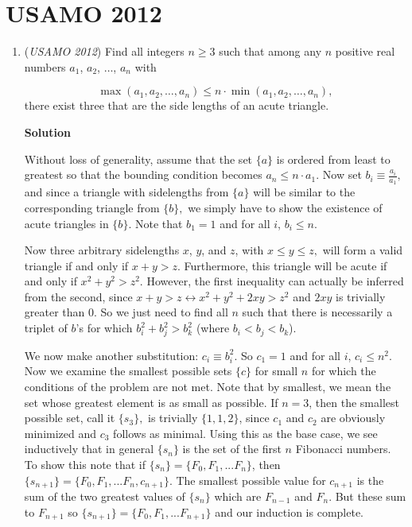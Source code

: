 \section{USAMO 2012}
        \begin{enumerate}
        	\item (\textit{USAMO 2012}) Find all integers $n \ge 3$ such that among any $n$ positive real numbers $a_1$, $a_2$, $\dots$, $a_n$ with

 \[\max(a_1, a_2, \dots, a_n) \le n \cdot \min(a_1, a_2, \dots, a_n),\]
there exist three that are the side lengths of an acute triangle.


 



\textbf{Solution}

Without loss of generality, assume that the set $\{a\}$ is ordered from least to greatest so that the bounding condition becomes $a_n \le n \cdot a_1.$ Now set $b_i \equiv \frac{a_i}{a_1},$ and since a triangle with sidelengths from $\{a\}$ will be similar to the corresponding triangle from $\{b\},$ we simply have to show the existence of acute triangles in $\{b\}.$ Note that $b_1 = 1$ and for all $i$, $b_i \le n.$

 Now three arbitrary sidelengths $x$, $y$, and $z$, with $x \le y \le z,$ will form a valid triangle if and only if $x+y>z.$ Furthermore, this triangle will be acute if and only if $x^2 + y^2 > z^2.$ However, the first inequality can actually be inferred from the second, since $x+y>z \longleftrightarrow x^2 + y^2 +2xy > z^2$ and $2xy$ is trivially greater than $0.$ So we just need to find all $n$ such that there is necessarily a triplet of $b$'s for which $b_i^2 + b_j^2 > b_k^2$ (where $b_i < b_j < b_k$).

 We now make another substitution: $c_i \equiv b_i ^2.$ So $c_1 = 1$ and for all $i$, $c_i \le n^2.$ Now we examine the smallest possible sets $\{c\}$ for small $n$ for which the conditions of the problem are not met. Note that by smallest, we mean the set whose greatest element is as small as possible. If $n=3$, then the smallest possible set, call it $\{s_3\},$ is trivially $\{1,1,2\}$, since $c_1$ and $c_2$ are obviously minimized and $c_3$ follows as minimal. Using this as the base case, we see inductively that in general $\{s_n\}$ is the set of the first $n$ Fibonacci numbers. To show this note that if $\{s_n\} = \{F_0, F_1, ... F_n\}$, then $\{s_{n+1}\} = \{F_0, F_1, ... F_n, c_{n+1}\}.$ The smallest possible value for $c_{n+1}$ is the sum of the two greatest values of $\{s_n\}$ which are $F_{n-1}$ and $F_n$. But these sum to $F_{n+1}$ so $\{s_{n+1}\} = \{F_0, F_1, ... F_{n+1}\}$ and our induction is complete.


\end{enumerate}
